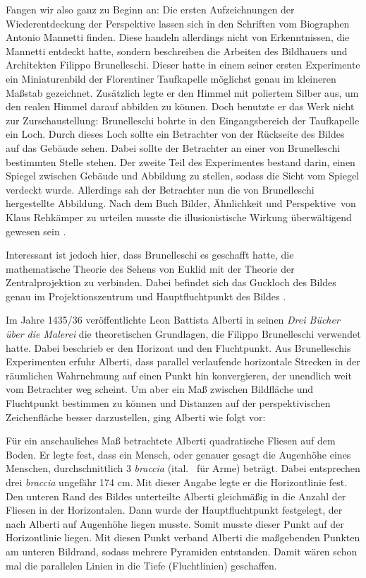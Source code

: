 \documentclass[12pt,a4paper]{article}
\begin{document}
Fangen wir also ganz zu Beginn an: Die ersten Aufzeichnungen der Wiederentdeckung der Perspektive lassen sich in den Schriften vom Biographen Antonio Mannetti finden. Diese handeln allerdings nicht von Erkenntnissen, die Mannetti entdeckt hatte, sondern beschreiben die Arbeiten des Bildhauers und Architekten Filippo Brunelleschi. Dieser hatte in einem seiner ersten Experimente ein Miniaturenbild der Florentiner Taufkapelle möglichst genau im kleineren Maßstab gezeichnet. Zusätzlich legte er den Himmel mit poliertem Silber aus, um den realen Himmel darauf abbilden zu können. Doch benutzte er das Werk nicht zur Zurschaustellung: Brunelleschi bohrte in den Eingangsbereich der Taufkapelle ein Loch. Durch dieses Loch sollte ein Betrachter von der Rückseite des Bildes auf das Gebäude sehen. Dabei sollte der Betrachter an einer von Brunelleschi bestimmten Stelle stehen. Der zweite Teil des Experimentes bestand darin, einen Spiegel zwischen Gebäude und Abbildung zu stellen, sodass die Sicht vom Spiegel verdeckt wurde. Allerdings sah der Betrachter nun die von Brunelleschi hergestellte Abbildung. Nach dem Buch \glqq Bilder, Ähnlichkeit und Perspektive\grqq ~von Klaus Rehkämper zu urteilen musste die illusionistische Wirkung überwältigend gewesen sein \citep[s.][S.~28f]{perspektive}.

Interessant ist jedoch hier, dass Brunelleschi es geschafft hatte, die mathematische Theorie des Sehens von Euklid mit der Theorie der Zentralprojektion zu verbinden. Dabei befindet sich das Guckloch des Bildes genau im Projektionszentrum und Hauptfluchtpunkt des Bildes \citep[S.~30]{perspektive}.

Im Jahre 1435/36 veröffentlichte Leon Battista Alberti in seinen \textit{Drei Bücher über die Malerei} die theoretischen Grundlagen, die Filippo Brunelleschi verwendet hatte. Dabei beschrieb er den Horizont und den Fluchtpunkt. Aus Brunelleschis Experimenten erfuhr Alberti, dass parallel verlaufende horizontale Strecken in der räumlichen Wahrnehmung auf einen Punkt hin konvergieren, der unendlich weit vom Betrachter weg scheint. Um aber ein Maß zwischen Bildfläche und Fluchtpunkt bestimmen zu können und Distanzen auf der perspektivischen Zeichenfläche besser darzustellen, ging Alberti wie folgt vor:

Für ein anschauliches Maß betrachtete Alberti quadratische Fliesen auf dem Boden. Er legte fest, dass ein Mensch, oder genauer gesagt die Augenhöhe eines Menschen, durchschnittlich 3 \textit{braccia} (ital.~ für \glqq Arme\grqq) beträgt. Dabei entsprechen drei \textit{braccia} ungefähr 174 cm. Mit dieser Angabe legte er die Horizontlinie fest. Den unteren Rand des Bildes unterteilte Alberti gleichmäßig in die Anzahl der Fliesen in der Horizontalen. Dann wurde der Hauptfluchtpunkt festgelegt, der nach Alberti auf Augenhöhe liegen musste. Somit musste dieser Punkt auf der Horizontlinie liegen. Mit diesen Punkt verband Alberti die maßgebenden Punkten am unteren Bildrand, sodass mehrere Pyramiden entstanden. Damit wären schon mal die parallelen Linien in die Tiefe (Fluchtlinien) geschaffen.
\end{document}
